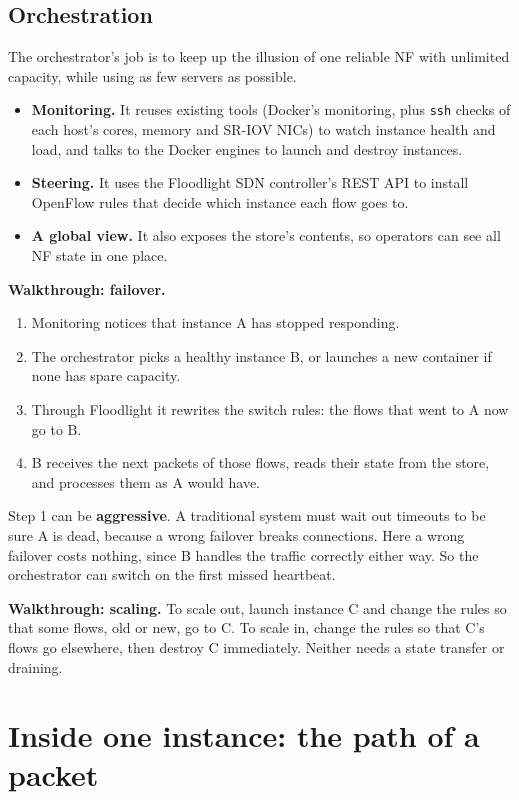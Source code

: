 \subsection{Orchestration}
The orchestrator's job is to keep up the illusion of one reliable NF with unlimited capacity, while using as few servers as possible.
\begin{itemize}
  \item \textbf{Monitoring.} It reuses existing tools (Docker's monitoring, plus \texttt{ssh} checks of each host's cores, memory and SR-IOV NICs) to watch
        instance health and load, and talks to the Docker engines to launch and destroy instances.
  \item \textbf{Steering.} It uses the Floodlight SDN controller's REST API to install OpenFlow rules that decide which instance each flow goes to.
  \item \textbf{A global view.} It also exposes the store's contents, so operators can see all NF state in one place.
\end{itemize}

\textbf{Walkthrough: failover.}
\begin{enumerate}
  \item Monitoring notices that instance A has stopped responding.
  \item The orchestrator picks a healthy instance B, or launches a new container if none has spare capacity.
  \item Through Floodlight it rewrites the switch rules: the flows that went to A now go to B.
  \item B receives the next packets of those flows, reads their state from the store, and processes them as A would have.
\end{enumerate}
Step 1 can be \textbf{aggressive}. A traditional system must wait out timeouts to be sure A is dead, because a wrong failover breaks
connections. Here a wrong failover costs nothing, since B handles the traffic correctly either way. So the orchestrator can switch on the
first missed heartbeat.

\textbf{Walkthrough: scaling.} To scale out, launch instance C and change the rules so that some flows, old or new, go to C. To scale in,
change the rules so that C's flows go elsewhere, then destroy C immediately. Neither needs a state transfer or draining.

\section{Inside one instance: the path of a packet}

